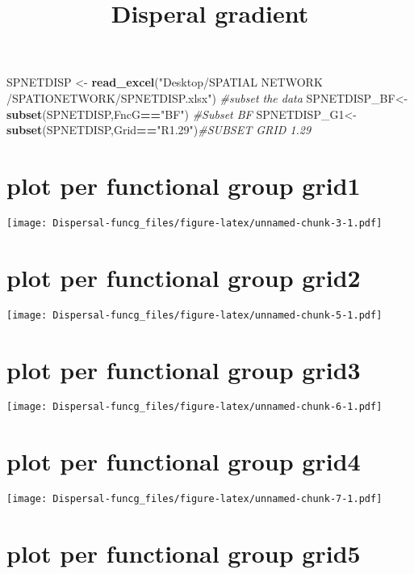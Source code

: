 \documentclass[]{article}
\title{Disperal gradient}
\author{}
\date{}
\newenvironment{Shaded}{\begin{snugshade}}{\end{snugshade}}
\newcommand{\KeywordTok}[1]{\textcolor[rgb]{0.13,0.29,0.53}{\textbf{#1}}}
\newcommand{\StringTok}[1]{\textcolor[rgb]{0.31,0.60,0.02}{#1}}
\newcommand{\CommentTok}[1]{\textcolor[rgb]{0.56,0.35,0.01}{\textit{#1}}}
\newcommand{\OperatorTok}[1]{\textcolor[rgb]{0.81,0.36,0.00}{\textbf{#1}}}
\newcommand{\NormalTok}[1]{#1}
\begin{document}
\maketitle

\begin{Shaded}
\begin{Highlighting}[]
\NormalTok{SPNETDISP <-}\StringTok{ }\KeywordTok{read_excel}\NormalTok{(}\StringTok{"Desktop/SPATIAL NETWORK /SPATIONETWORK/SPNETDISP.xlsx"}\NormalTok{)}
\CommentTok{#subset the data}
\NormalTok{SPNETDISP_BF<-}\KeywordTok{subset}\NormalTok{(SPNETDISP,FncG}\OperatorTok{==}\StringTok{"BF"}\NormalTok{) }\CommentTok{#Subset BF}
\NormalTok{SPNETDISP_G1<-}\KeywordTok{subset}\NormalTok{(SPNETDISP,Grid}\OperatorTok{==}\StringTok{"R1.29"}\NormalTok{)}\CommentTok{#SUBSET GRID 1.29}
\end{Highlighting}
\end{Shaded}

\section{plot per functional group
grid1}\label{plot-per-functional-group-grid1}

\texttt{[image: Dispersal-funcg\_files/figure-latex/unnamed-chunk-3-1.pdf]}

\section{plot per functional group
grid2}\label{plot-per-functional-group-grid2}

\texttt{[image: Dispersal-funcg\_files/figure-latex/unnamed-chunk-5-1.pdf]}

\section{plot per functional group
grid3}\label{plot-per-functional-group-grid3}

\texttt{[image: Dispersal-funcg\_files/figure-latex/unnamed-chunk-6-1.pdf]}

\section{plot per functional group
grid4}\label{plot-per-functional-group-grid4}

\texttt{[image: Dispersal-funcg\_files/figure-latex/unnamed-chunk-7-1.pdf]}

\section{plot per functional group
grid5}\label{plot-per-functional-group-grid5}
\end{document}

